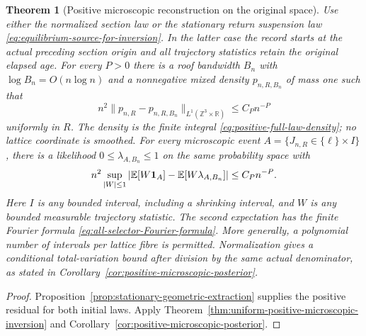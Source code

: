 \documentclass[11pt,reqno]{amsart}
\numberwithin{equation}{section}
\newtheorem{maintheorem}{Theorem}
\theoremstyle{definition}\newtheorem{definition}[theorem]{Definition}
\theoremstyle{remark}\newtheorem{remark}[theorem]{Remark}
\newcommand{\R}{\mathbb R}\newcommand{\Z}{\mathbb Z}\newcommand{\T}{\mathbb T}
\begin{document}
\begin{maintheorem}[Positive microscopic reconstruction on the original space]
\label{thm:intro-positive-microscopic-conditioning}
Use either the normalized section law or the stationary return
suspension law \eqref{eq:equilibrium-source-for-inversion}. In the latter
case the record starts at the actual preceding section origin and all
trajectory statistics retain the original elapsed age.
For every $P>0$ there is a roof bandwidth $B_n$ with
$\log B_n=O(n\log n)$ and a nonnegative mixed density $p_{n,R,B_n}$
of mass one such that
\[
 n^2\|p_{n,R}-p_{n,R,B_n}\|_{L^1(\Z^3\times\R)}\le C_Pn^{-P}
\]
uniformly in $R$. The density is the finite integral
\eqref{eq:positive-full-law-density}; no lattice coordinate is smoothed.
For every microscopic event $A=\{J_{n,R}\in\{\ell\}\times I\}$, there
is a likelihood $0\le\lambda_{A,B_n}\le1$ on the same probability
space with
\[
 n^2\sup_{|W|\le1}
 \left|\mathbb E[W\mathbf1_A]-\mathbb E[W\lambda_{A,B_n}]\right|
        \le C_Pn^{-P}.
\]
Here $I$ is any bounded interval, including a shrinking interval, and
$W$ is any bounded measurable trajectory statistic. The second
expectation has the finite Fourier formula
\eqref{eq:all-selector-Fourier-formula}. More generally, a polynomial
number of intervals per lattice fibre is permitted. Normalization gives
a conditional total-variation bound after division by the same actual
denominator, as stated in Corollary~\ref{cor:positive-microscopic-posterior}.
\end{maintheorem}
\begin{proof}
Proposition~\ref{prop:stationary-geometric-extraction} supplies the
positive residual for both initial laws. Apply
Theorem~\ref{thm:uniform-positive-microscopic-inversion} and
Corollary~\ref{cor:positive-microscopic-posterior}.
\end{proof}
\end{document}
